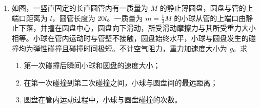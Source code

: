 \documentclass[\gkver]{gaokaozhenti}
\begin{document}
\begin{enumerate}
{\begin{enumerate}
	\item
	$\frac{{3 - \sqrt 3 }}{3}q$

\end{enumerate}
}

\item
如图，一竖直固定的长直圆管内有一质量为 $M$ 的静止薄圆盘，圆盘与管的上端口距离为 $l$，圆管长度为 20$l$。一质量为 $m = \frac{1}{3}M$ 的小球从管的上端口由静止下落，并撞在圆盘中心，圆盘向下滑动，所受滑动摩擦力与其所受重力大小相等。小球在管内运动时与管壁不接触，圆盘始终水平，小球与圆盘发生的碰撞均为弹性碰撞且碰撞时间极短。不计空气阻力，重力加速度大小为 $g$。求
\begin{enumerate}
	\item
	第一次碰撞后瞬间小球和圆盘的速度大小；
	\item
	在第一次碰撞到第二次碰撞之间，小球与圆盘间的最远距离；
	\item
	圆盘在管内运动过程中，小球与圆盘碰撞的次数。
\end{enumerate}
\end{enumerate}
\end{document}
